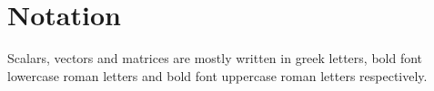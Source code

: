 \documentclass[%
	english,%
	8pt%
]{extreport}
\title{\parbox[t]{.9\textwidth}{\centering{Compendia in Math, Statistics, {Machine~Learning}, Robotics and {Robot~Learning}}}}
\author{%
	Hesse, Thomas\\\texttt{mail@thomas-hesse.eu}%
	\\[5ex]%
	Faber, Natalie\\\texttt{mail@e-mail.mail}}%
\begin{document}
\customtitle\tableofcontents\clearpage
%
%
\bgroup
{}
\renewcommand*{\arraystretch}{1.5}
\renewcommand{\itab}[1]{\hspace{0em}\rlap{\parbox[t]{.24\textwidth}{\textbf{#1}}}}
\newcommand{\N}[2]{%
	\ifodd\value{notationctr}%
		\item[]\colorbox{whitegrayish}{%
			\parbox{.85\textwidth}{%
				\itab{\ensuremath{#1}}\htab{#2}%
			}%
		}%
	\else%
		\item[]\colorbox{white}{%
			\parbox{.85\textwidth}{%
				\itab{\ensuremath{#1}}\htab{#2}%
			}%
		}%
	\fi%
	\stepcounter{notationctr}%
}
\chapter{Notation}
Scalars, vectors and matrices are mostly written in greek letters, bold font lowercase roman letters and bold font uppercase roman letters respectively. %
\end{document}
